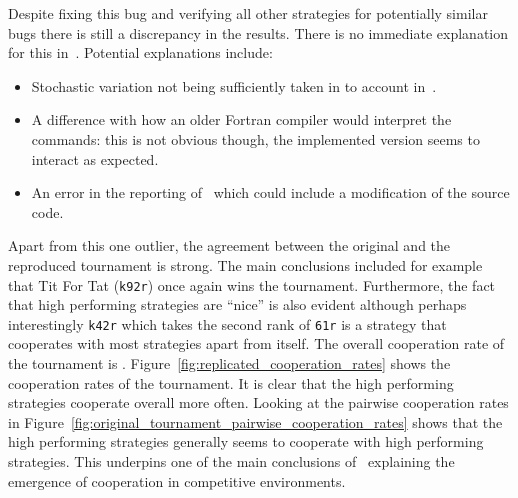 \documentclass{article}
\begin{document}
Despite fixing this bug and verifying all other strategies for potentially
similar bugs there is still a discrepancy in the results.
There is no immediate explanation for this
in~\cite{Axelrod1980b}. Potential explanations include:

\begin{itemize}
    \item Stochastic variation not being sufficiently taken in to account
        in~\cite{Axelrod1980b}.
    \item A difference with how an older Fortran compiler would interpret the
        commands: this is not obvious though, the implemented version seems to
        interact as expected.
    \item An error in the reporting of~\cite{Axelrod1980b} which could include
        a modification of the source code.
\end{itemize}

Apart from this one outlier, the agreement between the original and the
reproduced tournament is strong. The main conclusions included for example that
Tit For Tat (\texttt{k92r}) once again wins the tournament. Furthermore, the
fact that high performing strategies are ``nice'' is also evident although
perhaps interestingly \texttt{k42r} which takes the second rank of \texttt{61r}
is a strategy that cooperates with most strategies apart from itself.  The
overall cooperation rate of the tournament is
.
Figure~\ref{fig:replicated_cooperation_rates} shows the cooperation rates of
the tournament. It is clear that the high performing strategies cooperate
overall more often. Looking at the pairwise cooperation rates in
Figure~\ref{fig:original_tournament_pairwise_cooperation_rates} shows that the
high performing strategies generally seems to cooperate with high performing
strategies. This underpins one of the main conclusions of~\cite{Axelrod1980b}
explaining the emergence of cooperation in competitive environments.
\end{document}
